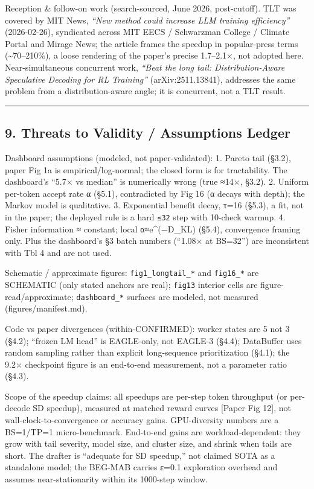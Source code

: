 \documentclass[
  11pt,
  letterpaper,
]{article}
\begin{document}
Reception \& follow-on work (search-sourced, June 2026, post-cutoff).
TLT was covered by MIT News, \emph{``New method could increase LLM
training efficiency''} (2026-02-26), syndicated across MIT EECS /
Schwarzman College / Climate Portal and Mirage News; the article frames
the speedup in popular-press terms (\textasciitilde70--210\%), a loose
rendering of the paper's precise 1.7--2.1×, not adopted here.
Near-simultaneous concurrent work, \emph{``Beat the long tail:
Distribution-Aware Speculative Decoding for RL Training''}
(arXiv:2511.13841), addresses the same problem from a distribution-aware
angle; it is concurrent, not a TLT result.

\begin{center}\rule{0.5\linewidth}{0.5pt}\end{center}

\subsection{9. Threats to Validity / Assumptions
Ledger}\label{threats-to-validity-assumptions-ledger}

Dashboard assumptions (modeled, not paper-validated): 1. Pareto tail
(§3.2), paper Fig 1a is empirical/log-normal; the closed form is for
tractability. The dashboard's ``5.7× vs median'' is numerically wrong
(true ≈14×, §3.2). 2. Uniform per-token accept rate α (§5.1),
contradicted by Fig 16 (α decays with depth); the Markov model is
qualitative. 3. Exponential benefit decay, τ=16 (§5.3), a fit, not in
the paper; the deployed rule is a hard \texttt{≤32} step with 10-check
warmup. 4. Fisher information ≈ constant; local α≈e\^{}(−D\_KL) (§5.4),
convergence framing only. Plus the dashboard's §3 batch numbers (``1.08×
at BS=32'') are inconsistent with Tbl 4 and are not used.

Schematic / approximate figures: \texttt{fig1\_longtail\_*} and
\texttt{fig16\_*} are SCHEMATIC (only stated anchors are real);
\texttt{fig13} interior cells are
figure-read/approximate; \texttt{dashboard\_*} surfaces are modeled, not
measured (figures/manifest.md).

Code vs paper divergences (within-CONFIRMED): worker states are 5 not 3
(§4.2); ``frozen LM head'' is EAGLE-only, not EAGLE-3 (§4.4); DataBuffer
uses random sampling rather than explicit long-sequence prioritization
(§4.1); the 9.2× checkpoint figure is an end-to-end measurement, not a
parameter ratio (§4.3).

Scope of the speedup claims: all speedups are per-step token throughput
(or per-decode SD speedup), measured at matched reward curves {[}Paper
Fig 12{]}, not wall-clock-to-convergence or accuracy gains.
GPU-diversity numbers are a BS=1/TP=1 micro-benchmark. End-to-end gains
are workload-dependent: they grow with tail severity, model size, and
cluster size, and shrink when tails are short. The drafter is ``adequate
for SD speedup,'' not claimed SOTA as a standalone model; the BEG-MAB
carries ε=0.1 exploration overhead and assumes near-stationarity within
its 1000-step window.
\end{document}
